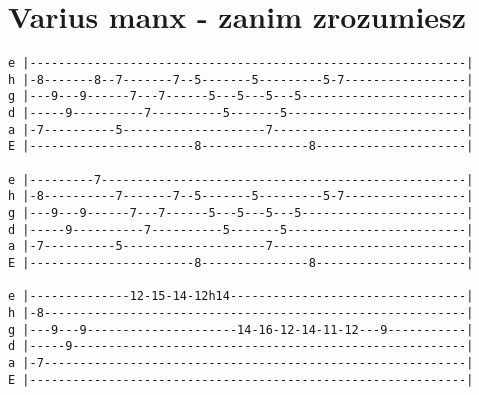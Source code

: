 \section{Varius manx - zanim zrozumiesz}
\begin{verbatim}
e |-------------------------------------------------------------|
h |-8-------8--7-------7--5-------5---------5-7-----------------|
g |---9---9------7---7------5---5---5---5-----------------------|
d |-----9----------7----------5-------5-------------------------|
a |-7----------5--------------------7---------------------------|
E |-----------------------8---------------8---------------------|

e |---------7---------------------------------------------------|
h |-8----------7-------7--5-------5---------5-7-----------------|
g |---9---9------7---7------5---5---5---5-----------------------|
d |-----9----------7----------5-------5-------------------------|
a |-7----------5--------------------7---------------------------|
E |-----------------------8---------------8---------------------|

e |--------------12-15-14-12h14---------------------------------|
h |-8-----------------------------------------------------------|
g |---9---9---------------------14-16-12-14-11-12---9-----------|
d |-----9-------------------------------------------------------|
a |-7-----------------------------------------------------------|
E |-------------------------------------------------------------|
\end{verbatim}
\newpage


